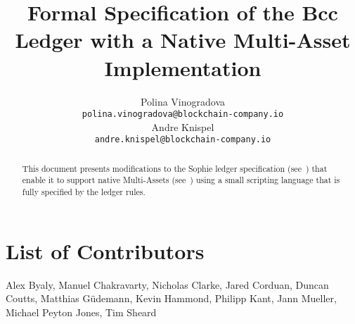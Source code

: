 
\title{Formal Specification of the Bcc Ledger with a Native
Multi-Asset Implementation}
\renewcommand{\thepage}{\arabic{page}}
\setcounter{page}{1}

\author{
   Polina Vinogradova \\ {\small \texttt{polina.vinogradova@blockchain-company.io}} \\
   Andre Knispel \\ {\small \texttt{andre.knispel@blockchain-company.io}} \\
   }

\date{}

\maketitle

\begin{abstract}
This document presents modifications to the Sophie ledger
specification
(see~\cite{sophie_spec}) that enable it to support native
Multi-Assets (see~\cite{multi_currency})
using a small scripting language that is fully specified
by the ledger rules.
\end{abstract}

\section*{List of Contributors}
\label{acknowledgements}

Alex Byaly,
Manuel Chakravarty,
Nicholas Clarke,
Jared Corduan,
Duncan Coutts,
Matthias G\"{u}demann,
Kevin Hammond,
Philipp Kant,
Jann Mueller,
Michael Peyton Jones,
Tim Sheard
